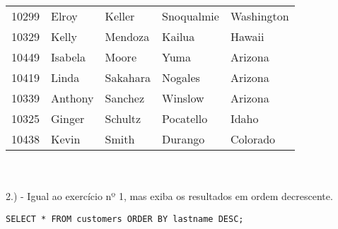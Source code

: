 \begin{tabular}{lllll}
    10299                                                              & Elroy                                                             & Keller                                                           & Snoqualmie    & Washington     \\
    10329                                                              & Kelly                                                             & Mendoza                                                          & Kailua        & Hawaii         \\
    10449                                                              & Isabela                                                           & Moore                                                            & Yuma          & Arizona        \\
    10419                                                              & Linda                                                             & Sakahara                                                         & Nogales       & Arizona        \\
    10339                                                              & Anthony                                                           & Sanchez                                                          & Winslow       & Arizona        \\
    10325                                                              & Ginger                                                            & Schultz                                                          & Pocatello     & Idaho          \\
    10438                                                              & Kevin                                                             & Smith                                                            & Durango       & Colorado      
\end{tabular} \\ \\


2.) - Igual ao exercício nº 1, mas exiba os resultados em ordem decrescente.

\begin{lstlisting}
SELECT * FROM customers ORDER BY lastname DESC;
\end{lstlisting}

